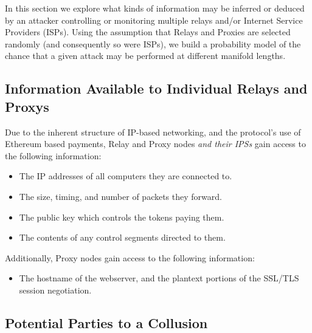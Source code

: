 

In this section we explore what kinds of information may be inferred
or deduced by an attacker controlling or monitoring multiple relays
and/or Internet Service Providers (ISPs). Using the assumption that
Relays and Proxies are selected randomly (and consequently so were
ISPs), we build a probability model of the chance that a given attack
may be performed at different manifold lengths.

\subsection{Information Available to Individual Relays and Proxys}
\label{relay-proxy-info-known}

Due to the inherent structure of IP-based networking, and the
\Orchid{} protocol's use of Ethereum based payments, Relay and Proxy
nodes \emph{and their IPSs} gain access to the following information:

\begin{itemize}
\item The IP addresses of all computers they are connected to.
\item The size, timing, and number of packets they forward.
\item The public key which controls the tokens paying them.
\item The contents of any control segments directed to them.
\end{itemize}

Additionally, Proxy nodes gain access to the following information:

\begin{itemize}
\item The hostname of the webserver, and the plantext portions of the
  SSL/TLS session negotiation.
\end{itemize}

\subsection{Potential Parties to a Collusion}
\label{sec:collusion}

